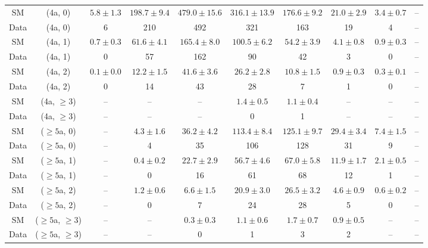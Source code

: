 \begin{table}[h!]
{\begin{tabular}{cccccccccc}
	SM & (4a, 0) & $5.8\pm 1.3$ & $198.7\pm 9.4$ & $479.0\pm 15.6$ & $316.1\pm 13.9$ & $176.6\pm 9.2$ & $21.0\pm 2.9$ & $3.4\pm 0.7$ & -- \\[0.5ex] 
	Data & (4a, 0) & 6 & 210 & 492 & 321 & 163 & 19 & 4 & -- \\[0.5ex] 
	SM & (4a, 1) & $0.7\pm 0.3$ & $61.6\pm 4.1$ & $165.4\pm 8.0$ & $100.5\pm 6.2$ & $54.2\pm 3.9$ & $4.1\pm 0.8$ & $0.9\pm 0.3$ & -- \\[0.5ex] 
	Data & (4a, 1) & 0 & 57 & 162 & 90 & 42 & 3 & 0 & -- \\[0.5ex] 
	SM & (4a, 2) & $0.1\pm 0.0$ & $12.2\pm 1.5$ & $41.6\pm 3.6$ & $26.2\pm 2.8$ & $10.8\pm 1.5$ & $0.9\pm 0.3$ & $0.3\pm 0.1$ & -- \\[0.5ex] 
	Data & (4a, 2) & 0 & 14 & 43 & 28 & 7 & 1 & 0 & -- \\[0.5ex] 
	SM & (4a, $\ge3$) & -- & -- & -- & $1.4\pm 0.5$ & $1.1\pm 0.4$ & -- & -- & -- \\[0.5ex] 
	Data & (4a, $\ge3$) & -- & -- & -- & 0 & 1 & -- & -- & -- \\[0.5ex] 
	SM & ($\ge5$a, 0) & -- & $4.3\pm 1.6$ & $36.2\pm 4.2$ & $113.4\pm 8.4$ & $125.1\pm 9.7$ & $29.4\pm 3.4$ & $7.4\pm 1.5$ & -- \\[0.5ex] 
	Data & ($\ge5$a, 0) & -- & 4 & 35 & 106 & 128 & 31 & 9 & -- \\[0.5ex] 
	SM & ($\ge5$a, 1) & -- & $0.4\pm 0.2$ & $22.7\pm 2.9$ & $56.7\pm 4.6$ & $67.0\pm 5.8$ & $11.9\pm 1.7$ & $2.1\pm 0.5$ & -- \\[0.5ex] 
	Data & ($\ge5$a, 1) & -- & 0 & 16 & 61 & 68 & 12 & 1 & -- \\[0.5ex] 
	SM & ($\ge5$a, 2) & -- & $1.2\pm 0.6$ & $6.6\pm 1.5$ & $20.9\pm 3.0$ & $26.5\pm 3.2$ & $4.6\pm 0.9$ & $0.6\pm 0.2$ & -- \\[0.5ex] 
	Data & ($\ge5$a, 2) & -- & 0 & 7 & 24 & 28 & 5 & 0 & -- \\[0.5ex] 
	SM & ($\ge5$a, $\ge3$) & -- & -- & $0.3\pm 0.3$ & $1.1\pm 0.6$ & $1.7\pm 0.7$ & $0.9\pm 0.5$ & -- & -- \\[0.5ex] 
	Data & ($\ge5$a, $\ge3$) & -- & -- & 0 & 1 & 3 & 2 & -- & -- \\[0.5ex] 
	\hline
	\hline
\end{tabular}}
\end{table}
